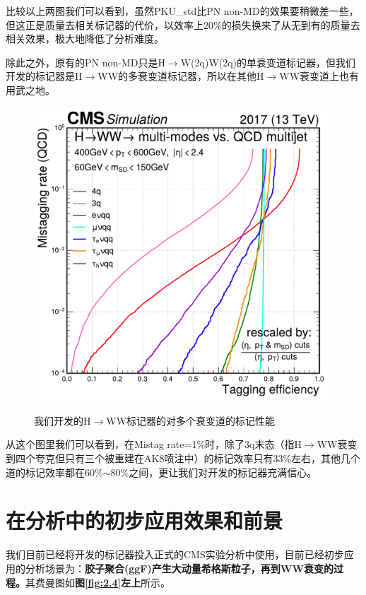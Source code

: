 比较以上两图我们可以看到，虽然PKU\_std比PN non-MD的效果要稍微差一些，但这正是质量去相关标记器的代价，以效率上20\%的损失换来了从无到有的质量去相关效果，极大地降低了分析难度。

除此之外，原有的PN non-MD只是H$\to$W(2q)W(2q)的单衰变道标记器，但我们开发的标记器是H$\to$WW的多衰变道标记器，所以在其他H$\to$WW衰变道上也有用武之地。
\begin{figure}[H]
 \centering
 \caption{我们开发的H$\to$WW标记器的对多个衰变道的标记性能}
 \includegraphics[height=11cm, width=11cm]{pictures/ROC_multi-modes_PKU_std.pdf}
 \label{fig:5.5}
\end{figure}
从这个图里我们可以看到，在Mistag rate=1\%时，除了3q末态（指H$\to$WW衰变到四个夸克但只有三个被重建在AK8喷注中）的标记效率只有33\%左右，其他几个道的标记效率都在60\%$\sim$80\%之间，更让我们对开发的标记器充满信心。
\section{在分析中的初步应用效果和前景}
我们目前已经将开发的标记器投入正式的CMS实验分析中使用，目前已经初步应用的分析场景为：\textbf{胶子聚合(ggF)产生大动量希格斯粒子，再到WW衰变的过程。}其费曼图如\textbf{图\ref{fig:2.4}左上}所示。

